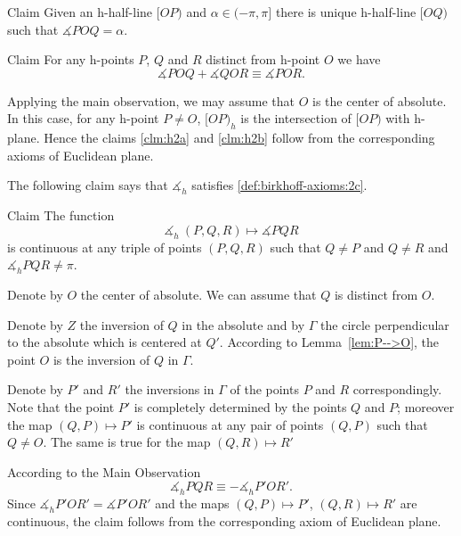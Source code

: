 \begin{thm}{Claim}\label{clm:h2a}
Given an h-half-line $[O P)$ and $\alpha\in(-\pi,\pi]$ there is unique  h-half-line $[O Q)$ such that $\measuredangle P O Q= \alpha$.
\end{thm}

\begin{thm}{Claim}\label{clm:h2b}
For any h-points $P$, $Q$ and $R$ distinct from h-point $O$ we have
$$\measuredangle P O Q+\measuredangle Q O R\equiv \measuredangle P O R.$$

\end{thm}

Applying the main observation, 
we may assume that $O$ is the center of absolute.
In this case, for any h-point $P\ne O$,
$[OP)_h$ is the intersection of $[OP)$ with h-plane.
Hence the claims \ref{clm:h2a} and \ref{clm:h2b} 
follow from the corresponding axioms of Euclidean plane.
\qeds

The following claim says that
$\measuredangle_h$ satisfies
 \ref{def:birkhoff-axioms:2c}.

\begin{thm}{Claim}\label{clm:h2c}
The function 
$$\measuredangle_h\:(P,Q,R)\mapsto\measuredangle P Q R$$
is continuous at any triple of points $(P,Q,R)$
such that $Q\ne P$ and $Q\ne R$ and $\measuredangle_h P Q R\ne\pi$.
\end{thm}

Denote by $O$ the center of absolute.
We can assume that $Q$ is distinct from $O$.

Denote by $Z$ the inversion of $Q$ in the absolute
and by $\Gamma$ the circle perpendicular to the absolute which is centered at $Q'$.
According to Lemma~\ref{lem:P-->O},
the point $O$ is the inversion of $Q$ in $\Gamma$.

Denote by $P'$ and $R'$ the inversions in $\Gamma$ of the points $P$ and $R$ correspondingly.
Note that the point $P'$ is completely determined by the points $Q$ and $P$;
moreover the map $(Q,P)\mapsto P'$ is continuous at any pair of points $(Q,P)$ such that $Q\ne O$.
The same is true for the map $(Q,R)\mapsto R'$

According to the Main Observation 
$$\measuredangle_h P Q R\equiv -\measuredangle_h P' O R'.$$
Since $\measuredangle_h P' O R'=\measuredangle P' O R'$ and 
the maps $(Q,P)\mapsto P'$, $(Q,R)\mapsto R'$ are continuous,
the claim follows from the corresponding axiom of Euclidean plane.
\qeds

